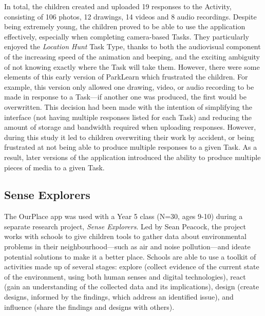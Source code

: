 In total, the children created and uploaded 19 responses to the Activity, consisting of 106 photos, 12 drawings, 14 videos and 8 audio recordings. Despite being extremely young, the children proved to be able to use the application effectively, especially when completing camera-based Tasks. They particularly enjoyed the \textit{Location Hunt} Task Type, thanks to both the audiovisual component of the increasing speed of the animation and beeping, and the exciting ambiguity of not knowing exactly where the Task will take them. However, there were some elements of this early version of ParkLearn which frustrated the children. For example, this version only allowed one drawing, video, or audio recording to be made in response to a Task---if another one was produced, the first would be overwritten. This decision had been made with the intention of simplifying the interface (not having multiple responses listed for each Task) and reducing the amount of storage and bandwidth required when uploading responses. However, during this study it led to children overwriting their work by accident, or being frustrated at not being able to produce multiple responses to a given Task. As a result, later versions of the application introduced the ability to produce multiple pieces of media to a given Task.

\subsection{Sense Explorers}
\label{sec:SenseExplorers}

The OurPlace app was used with a Year 5 class (N=30, ages 9-10) during a separate research project, \textit{Sense Explorers}. Led by Sean Peacock, the project works with schools to give children tools to gather data about environmental problems in their neighbourhood---such as air and noise pollution---and ideate potential solutions to make it a better place. Schools are able to use a toolkit of activities made up of several stages: explore (collect evidence of the current state of the environment, using both human senses and digital technologies), react (gain an understanding of the collected data and its implications), design (create designs, informed by the findings, which address an identified issue), and influence (share the findings and designs with others). 

